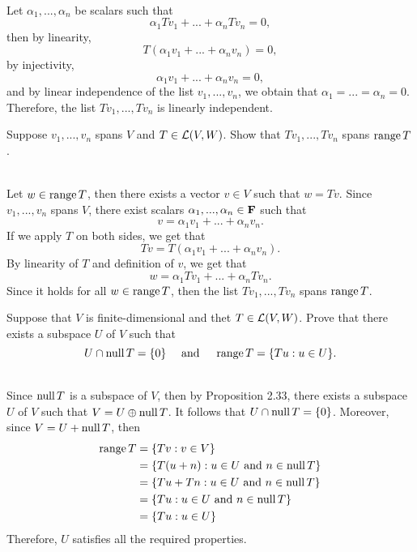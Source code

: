 \begin{solution}
    \\ Let $\alpha_1, ..., \alpha_n$ be scalars such that
    $$\alpha_1 Tv_1 + ... + \alpha_n Tv_n = 0,$$
    then by linearity,
    $$T(\alpha_1 v_1 + ... + \alpha_n v_n) = 0,$$
    by injectivity,
    $$\alpha_1 v_1 + ... + \alpha_n v_n = 0,$$
    and by linear independence of the list $v_1, ..., v_n$, we obtain that $\alpha_1 = ... = \alpha_n = 0$. Therefore, the list $Tv_1, ..., Tv_n$ is linearly independent. \\
\end{solution}

\begin{exercise}
    Suppose $v_1, ..., v_n$ spans $V$ and $T \in \mathcal{L}(V,W)$. Show that $Tv_1, ..., Tv_n$ spans $\operatorname{\text{range}} T$. \\
\end{exercise}

\begin{solution}
    \\ Let $w \in \operatorname{\text{range}} T$, then there exists a vector $v \in V$ such that $w = Tv$. Since $v_1, ..., v_n$ spans $V$, there exist scalars $\alpha_1, ..., \alpha_n \in \mathbf{F}$ such that
    $$v = \alpha_1 v_1 + ... + \alpha_n v_n.$$
    If we apply $T$ on both sides, we get that
    $$Tv = T(\alpha_1 v_1 + ... + \alpha_n v_n).$$
    By linearity of $T$ and definition of $v$, we get that
    $$w = \alpha_1 Tv_1 + ... + \alpha_n Tv_n.$$
    Since it holds for all $w \in \operatorname{\text{range}} T$, then the list $Tv_1, ..., Tv_n$ spans $\operatorname{\text{range}} T$. \\
\end{solution}

\begin{exercise}
    Suppose that $V$ is finite-dimensional and thet $T \in \mathcal{L}(V,W)$. Prove that there exists a subspace $U$ of $V$ such that
    $$U \cap \operatorname{\text{null}} T = \{0\} \quad \text{ and } \quad \operatorname{\text{range}} T = \{Tu : u \in U\}.$$
\end{exercise}

\begin{solution}
    \\ Since $\operatorname{\text{null}} T$ is a subspace of $V$, then by Proposition 2.33, there exists a subspace $U$ of $V$ such that $V = U \oplus \operatorname{\text{null}} T$. It follows that $U \cap \operatorname{\text{null}} T = \{0\}$. Moreover, since $V = U + \operatorname{\text{null}} T$, then 
    \begin{align*}
        \operatorname{\text{range}} T &= \{Tv : v\in V\} \\
        &= \{T(u + n) : u \in U \text{ and } n \in \operatorname{\text{null}} T\} \\
        &= \{Tu + Tn : u \in U \text{ and } n \in \operatorname{\text{null}} T\} \\
        &= \{Tu : u \in U \text{ and } n \in \operatorname{\text{null}} T\} \\
        &= \{Tu : u \in U\}
    \end{align*}
    Therefore, $U$ satisfies all the required properties. \\
\end{solution}

